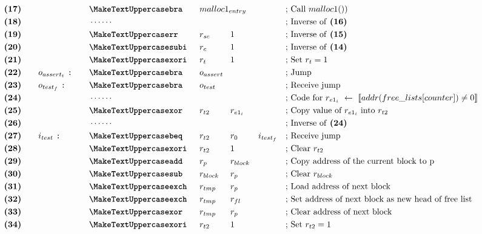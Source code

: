 \begin{figure}[ht]
{\begin{minipage}{\linewidth}
\begin{alignat*}{7}
    &\textbf{(17)}\quad&& &&\inst{bra}\quad &&malloc1_{entry} \span\omit\span\quad \span\omit\span\quad && \text{; Call $malloc1()$)}\\
    &\textbf{(18)}\quad&& &&\cdots\cdots && && && &&\text{; Inverse of \textbf{(16)}}\\
    &\textbf{(19)}\quad&& &&\inst{rr} &&r_{sc}\ && 1 && && \text{; Inverse of \textbf{(15)}}\\
    &\textbf{(20)}\quad&& &&\inst{subi} &&r_{c} && 1 && && \text{; Inverse of \textbf{(14)}}\\
    &\textbf{(21)}\quad&& &&\inst{xori} &&r_t && 1 && && \text{; Set $r_t = 1$}\\
    &\textbf{(22)}\quad&&o_{assert_t}\ \texttt{:}\quad &&\inst{bra} &&o_{assert} \span\omit\span\quad \span\omit\span\quad && \text{; Jump}\\
    &\textbf{(23)}\quad&&o_{test_f}\ \texttt{:}\quad &&\inst{bra} &&o_{test} \span\omit\span\quad \span\omit\span\quad && \text{; Receive jump}\\
    &\textbf{(24)}\quad&& &&\cdots\cdots && && && &&\text{; Code for $r_{e1_i}\ \leftarrow\ \llbracket addr(free\_lists[counter]) \neq 0 \rrbracket$}\\
    &\textbf{(25)}\quad&& &&\inst{xor}\quad &&r_{t2} && r_{e1_i} && &&\text{; Copy value of $r_{e1_i}$ into $r_{t2}$}\\        
    &\textbf{(26)}\quad&& &&\cdots\cdots && && && &&\text{; Inverse of \textbf{(24)}}\\
    &\textbf{(27)}\quad&&i_{test}\ \texttt{:}\quad &&\inst{beq} &&r_{t2} && r_0 && i_{test_f} && \text{; Receive jump}\\
    &\textbf{(28)}\quad&& &&\inst{xori} &&r_{t2} && 1 && && \text{; Clear $r_{t2}$}\\
    &\textbf{(29)}\quad&& &&\inst{add} &&r_{p} && r_{block} && && \text{; Copy address of the current block to p}\\
    &\textbf{(30)}\quad&& &&\inst{sub} &&r_{block}\ && r_{p} && && \text{; Clear $r_{block}$}\\
    &\textbf{(31)}\quad&& &&\inst{exch} &&r_{tmp} && r_{p} && && \text{; Load address of next block}\\
    &\textbf{(32)}\quad&& &&\inst{exch} &&r_{tmp} && r_{fl} && && \text{; Set address of next block as new head of free list}\\
    &\textbf{(33)}\quad&& &&\inst{xor} &&r_{tmp} && r_{p} && && \text{; Clear address of next block}\\
    &\textbf{(34)}\quad&& &&\inst{xori} &&r_{t2} && 1 && && \text{; Set $r_{t2} = 1$}\\

\end{alignat*}
\end{minipage}}
\end{figure}
